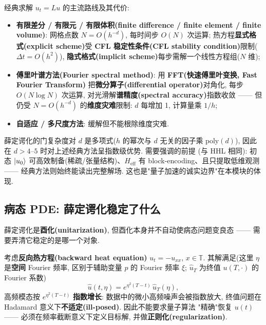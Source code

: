 \documentclass[utf8]{article} %
\numberwithin{equation}{section}   %
\newtheorem{Note}{\hskip 2em {\color{red} 注}}[subsection]
\begin{document}
\begin{Note}
    经典求解 $u_t = Lu$ 的主流路线及其代价:
    \begin{itemize}
        \item \textbf{有限差分 / 有限元 / 有限体积(finite difference / finite element / finite volume)}: 网格点数 $N = O(h^{-d})$,
        每时间步 $O(N)$ 次运算; 热方程\textbf{显式格式(explicit scheme)}受 \textbf{CFL 稳定性条件(CFL stability condition)}限制($\Delta t = O(h^2)$),
        \textbf{隐式格式(implicit scheme)}每步需解一个线性方程组($N$ 维);
        \item \textbf{傅里叶谱方法(Fourier spectral method)}: 用 \textbf{FFT(快速傅里叶变换, Fast Fourier Transform)} 把\textbf{微分算子(differential operator)}对角化, 每步 $O(N\log N)$ 次运算,
        对光滑解\textbf{谱精度(spectral accuracy)}指数收敛 —— 但仍受 $N = O(h^{-d})$ 的\textbf{维度灾难}限制:
        $d$ 每增加 1, 计算量乘 $1/h$;
        \item \textbf{自适应 / 多尺度方法}: 缓解但不能根除维度灾难.
    \end{itemize}
    薛定谔化的门复杂度对 $d$ 是多项式($h$ 的幂次与 $d$ 无关的因子乘 $\mathrm{poly}(d)$),
    因此在 $d > 4\text{--}5$ 时对上述经典方法呈指数级优势. 需要强调的前提
    (与 HHL 相同): 初态 $\ket{u_0}$ 可高效制备(稀疏/张量结构)、$H_{\mathrm{eff}}$ 有
    block-encoding、且只提取低维观测 —— 经典方法则始终能读出完整解场.
    这也是"量子加速的诚实边界"在本模块的体现.
\end{Note}

\subsection{病态 PDE: 薛定谔化稳定了什么}

薛定谔化是\textbf{酉化(unitarization)}, 但酉化本身并不自动使病态问题变良态 —— 需要弄清它稳定的是哪一个对象.

\begin{Note}
    考虑\textbf{反向热方程(backward heat equation)} $u_t = -u_{xx}$, $x \in \mathbb{T}$.
    其解满足(这里 $\eta$ 是\textbf{空间} Fourier 频率, 区别于辅助变量 $p$ 的
    Fourier 频率 $\xi$; $\hat u_T$ 为终值 $u(T,\cdot)$ 的 Fourier 系数)
    \begin{equation}
        \hat u(t, \eta) = e^{\eta^2 (T-t)}\,\hat u_T(\eta),
    \end{equation}
    高频模态按 $e^{\eta^2(T-t)}$ \textbf{指数增长}: 数据中的微小高频噪声会被指数放大,
    终值问题在 Hadamard 意义下\textbf{不适定(ill-posed)}. 因此不能要求量子算法
    "精确"恢复 $u(t)$ —— 必须在频率截断意义下定义目标解, 并做\textbf{正则化(regularization)}.
\end{Note}
\end{document}
